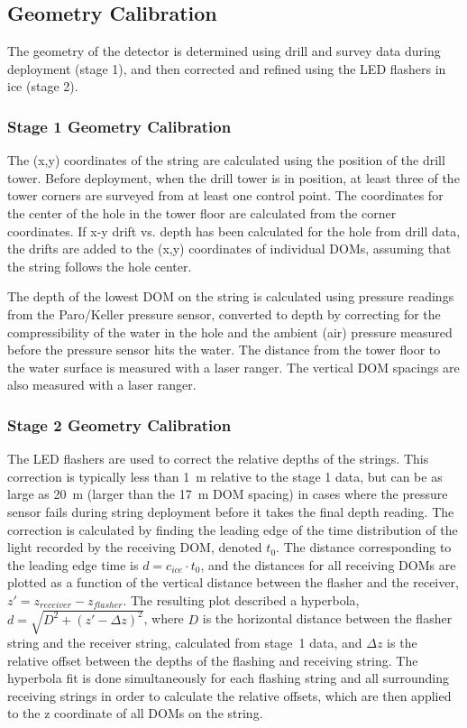 \subsection{Geometry Calibration}

The geometry of the detector is determined using drill and survey data
during deployment (stage 1), and then corrected and refined using the LED
flashers in ice (stage 2).
\subsubsection{Stage 1 Geometry Calibration}
The (x,y) coordinates of the string are calculated using the position
of the drill tower. Before deployment, when the drill tower is in position, at least three
of the tower corners are surveyed from at least one control point.
The coordinates for the center of the hole in the tower floor are
calculated from the corner coordinates. If x-y drift vs. depth has been calculated for the hole from drill
data, the drifts are added to the (x,y) coordinates of individual
DOMs, assuming that the string follows the hole center.

The depth of the lowest DOM on the string is calculated using pressure
readings from the Paro/Keller pressure sensor, converted to depth by correcting
for the compressibility of the water in the hole and the ambient (air)
pressure measured before the pressure sensor hits the water. The
distance from the tower floor to the water surface is measured with a
laser ranger. The vertical DOM spacings are also measured with a laser
ranger.

\subsubsection{Stage 2 Geometry Calibration}


The LED flashers are used to correct the relative depths of the
strings. This correction is typically less than 1~m relative to the
stage 1 data, but can be as large as 20~m (larger than the 17~m DOM
spacing) in cases where the pressure sensor fails during string
deployment before it takes the final depth reading. The correction is
calculated by finding the leading edge of the time distribution of the
light recorded by the
receiving DOM, denoted $t_0$. The distance corresponding to the
leading edge time is $d = c_{ice} \cdot t_0$, and the distances for
all receiving DOMs are plotted as a function of the vertical distance
between the flasher and the receiver, $z' = z_{receiver} -
z_{flasher}$. The resulting plot described a hyperbola, $d = \sqrt{D^2
+ (z' -\Delta z)^2}$, where $D$ is the horizontal distance between the
flasher string and the receiver string, calculated from stage~1 data,
and $\Delta z$ is the relative offset between the depths of the
flashing and receiving string. The hyperbola fit is done
simultaneously for each flashing string and all surrounding receiving
strings in order to calculate the relative offsets, which are then
applied to the z coordinate of all DOMs on the string.

